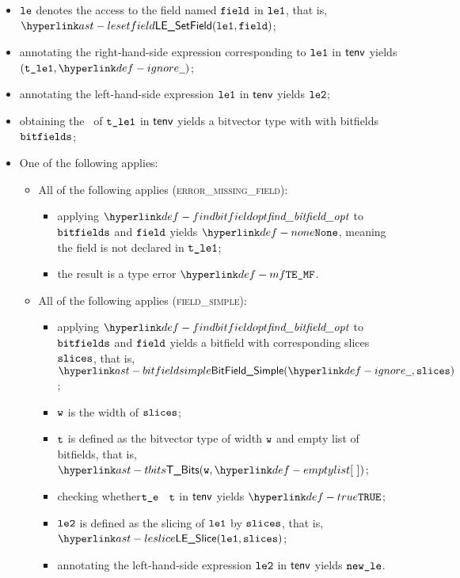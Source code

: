 \begin{itemize}
  \item $\texttt{le}$ denotes the access to the field named $\texttt{field}$ in $\texttt{le1}$, that is, \\ $\LESetField(\vleone, \field)$;
  \item annotating the right-hand-side expression corresponding to $\texttt{le1}$ in $\textsf{tenv}$ yields \\ $(\vtleone, \Ignore)$\ProseOrTypeError;
  \item annotating the left-hand-side expression $\texttt{le1}$ in $\textsf{tenv}$ yields $\texttt{le2}$\ProseOrTypeError;
  \item obtaining the \structure\ of $\texttt{t\_le1}$ in $\textsf{tenv}$ yields a bitvector type with with bitfields $\texttt{bitfields}$\ProseOrTypeError;
  \item One of the following applies:
  \begin{itemize}
    \item All of the following applies (\textsc{error\_missing\_field}):
    \begin{itemize}
      \item applying $\findbitfieldopt$ to $\texttt{bitfields}$ and $\texttt{field}$ yields $\None$, meaning the field is not declared
            in $\texttt{t\_le1}$;
      \item the result is a type error $\MissingField$.
    \end{itemize}

    \item All of the following applies (\textsc{field\_simple}):
    \begin{itemize}
      \item applying $\findbitfieldopt$ to $\texttt{bitfields}$ and $\texttt{field}$ yields a bitfield with corresponding slices $\texttt{slices}$,
            that is, $\BitFieldSimple(\Ignore, \slices)$;
      \item $\texttt{w}$ is the width of $\texttt{slices}$;
      \item $\texttt{t}$ is defined as the bitvector type of width $\texttt{w}$ and empty list of bitfields, that is, $\TBits(\vw, \emptylist)$;
      \item checking whether$\texttt{t\_e}$ \typesatisfies\ $\texttt{t}$ in $\textsf{tenv}$ yields $\True$\ProseOrTypeError;
      \item $\texttt{le2}$ is defined as the slicing of $\texttt{le1}$ by $\texttt{slices}$, that is, \\ $\LESlice(\vleone, \slices)$;
      \item annotating the left-hand-side expression $\texttt{le2}$ in $\textsf{tenv}$ yields $\texttt{new\_le}$\ProseOrTypeError.
    \end{itemize}


\end{itemize}
\end{itemize}
